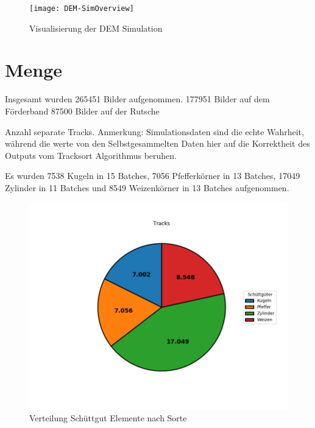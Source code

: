 \begin{figure}[h]
    \centering
	\texttt{[image: DEM-SimOverview]}
	\caption{Visualisierung der DEM Simulation~\cite{Pfaff2018}}
	\label{fig:DEMSimulation}
\end{figure}


\section{Menge}

Insgesamt wurden 265451 Bilder aufgenommen.
177951 Bilder auf dem Förderband
87500 Bilder auf der Rutsche


Anzahl separate Tracks.
Anmerkung: Simulationsdaten sind die echte Wahrheit, während die werte von den Selbstgesammelten Daten hier 
auf die Korrektheit des Outputs vom Tracksort Algorithmus beruhen. 

Es wurden 
7538 Kugeln in 15 Batches,
7056 Pfefferkörner in 13 Batches,
17049 Zylinder in 11 Batches
und 8549 Weizenkörner in 13 Batches aufgenommen.


\begin{figure}[h]
    \centering
    \includegraphics[width=\textwidth]{img/scaledPieChart-trimmed}
    \caption{Verteilung Schüttgut Elemente nach Sorte}
    \label{piechartSchuettgut}
\end{figure}


